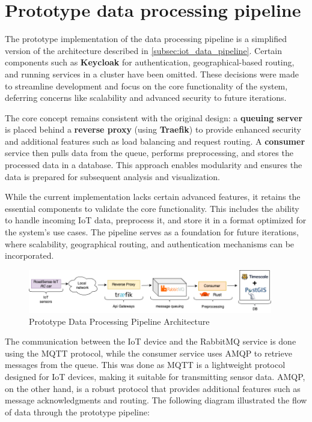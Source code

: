 \section{Prototype data processing pipeline}

The prototype implementation of the data processing pipeline is a simplified version of the architecture described in \autoref{subsec:iot_data_pipeline}. Certain components such as \textbf{Keycloak} for authentication, geographical-based routing, and running services in a cluster have been omitted. These decisions were made to streamline development and focus on the core functionality of the system, deferring concerns like scalability and advanced security to future iterations.

The core concept remains consistent with the original design: a \textbf{queuing server} is placed behind a \textbf{reverse proxy} (using \textbf{Traefik}) to provide enhanced security and additional features such as load balancing and request routing. A \textbf{consumer} service then pulls data from the queue, performs preprocessing, and stores the processed data in a database. This approach enables modularity and ensures the data is prepared for subsequent analysis and visualization.

While the current implementation lacks certain advanced features, it retains the essential components to validate the core functionality. This includes the ability to handle incoming IoT data, preprocess it, and store it in a format optimized for the system’s use cases. The pipeline serves as a foundation for future iterations, where scalability, geographical routing, and authentication mechanisms can be incorporated.

\begin{figure}[H]
	\begin{center}
		\includegraphics[width=0.95\textwidth]{../../assets/diagrams/prototype_pipeline/prototype_pipeline.png}
	\end{center}
	\caption{Prototype Data Processing Pipeline Architecture}
	\label{fig:prototype_pipeline}
\end{figure}

\noindent The communication between the IoT device and the RabbitMQ service is done using the MQTT protocol, while the consumer service uses AMQP to retrieve messages from the queue. This was done as MQTT is a lightweight protocol designed for IoT devices, making it suitable for transmitting sensor data. AMQP, on the other hand, is a robust protocol that provides additional features such as message acknowledgments and routing. The following diagram illustrated the flow of data through the prototype pipeline:

